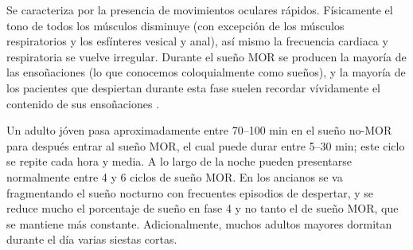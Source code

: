 Se caracteriza por la presencia de movimientos oculares r\'apidos. F\'isicamente el tono de todos 
los m\'usculos disminuye (con excepción de los m\'usculos respiratorios y los esf\'interes vesical 
y anal), as\'i mismo la frecuencia cardiaca y respiratoria se vuelve irregular.%
Durante el sue\~no MOR se producen la mayor\'ia de las enso\~naciones (lo que conocemos 
coloquialmente como sue\~nos), y la mayor\'ia de los pacientes que despiertan durante esta fase 
suelen recordar v\'ividamente el contenido de sus enso\~naciones \cite{Chokroverty09}.





Un adulto j\'oven pasa aproximadamente entre 70--100 min en el sue\~no no-MOR para despu\'es entrar 
al sue\~no MOR, el cual puede durar entre 5--30 min; este ciclo se repite cada hora y media.
A lo largo de la noche pueden presentarse normalmente entre 4 y 6 ciclos de 
sue\~no MOR.
En los ancianos se va fragmentando el sue\~no nocturno con frecuentes episodios de despertar, y se 
reduce mucho el porcentaje de sue\~no en fase 4 y no tanto el de sue\~no MOR, que se mantiene 
m\'as constante.%
Adicionalmente, muchos adultos mayores dormitan
durante el d\'ia varias siestas cortas\cite{CarrilloMora}.

